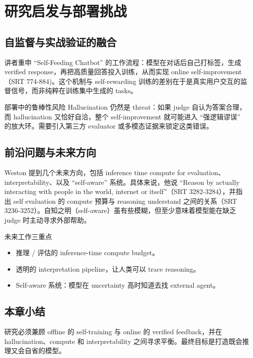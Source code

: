 \section{研究启发与部署挑战}
\subsection{自监督与实战验证的融合}
讲者重申 ``Self-Feeding Chatbot'' 的工作流程：模型在对话后自己打标签，生成 verified response，再把高质量回答投入训练，从而实现 online self-improvement（SRT 774-884)。这个机制与 self-rewarding 训练的差别在于是真实用户交互的监督信号，而非纯粹在训练集中生成的 tasks。

\begin{warningbox}{部署中的鲁棒性风险}
Hallucination 仍然是 threat：如果 judge 自认为答案合理，而 hallucination 又恰好自洽，整个 self-improvement 就可能进入 ``强逻辑谬误'' 的放大环。需要引入第三方 evaluator 或多模态证据来锁定这类错误。
\end{warningbox}

\subsection{前沿问题与未来方向}
Weston 提到几个未来方向，包括 inference time compute for evaluation、interpretability、以及 ``self-aware'' 系统。具体来说，他说 ``Reason by actually interacting with people in the world, internet or itself''（SRT 3282-3284），并指出 self evaluation 的 compute 预算与 reasoning understand 之间的关系（SRT 3236-3252）。自知之明（self-aware）虽有些模糊，但至少意味着模型能在缺乏 judge 时主动寻求外部帮助。

\begin{importantbox}{未来工作三重点}
\begin{itemize}
    \item 推理 / 评估的 inference-time compute budget。
    \item 透明的 interpretation pipeline，让人类可以 trace reasoning。
    \item Self-aware 系统：模型在 uncertainty 高时知道去找 external agent。
\end{itemize}
\end{importantbox}

\subsection{本章小结}
研究必须兼顾 offline 的 self-training 与 online 的 verified feedback，并在 hallucination、compute 和 interpretability 之间寻求平衡。最终目标是打造既会推理又会自省的模型。

